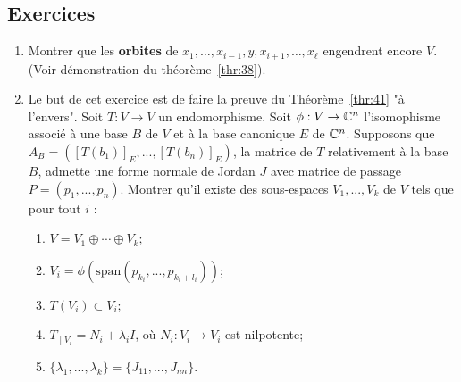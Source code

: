 \subsection*{Exercices} 

\begin{enumerate}
\item Montrer que les \textbf{orbites} de 
$ x_1,\dots, x_{i-1},y,x_{i+1},\dots,x_\ell $ engendrent encore $V$. (Voir démonstration du théorème~\ref{thr:38}). 

\item Le but de cet exercice est de faire la preuve du Théorème~\ref{thr:41} "à l'envers". \newline
Soit $T \colon V \rightarrow V$ un endomorphisme. Soit $\phi : V \rightarrow \Bbb C^n$ l'isomophisme associé à une base $B$ de $V$ et à la base canonique $E$ de $\Bbb C^n$. Supposons que $A_{B} = ([T(b_1)]_E, ..., [T(b_n)]_E)$, la matrice de $T$ relativement à la base $B$, admette une forme normale de Jordan $J$ avec matrice de passage $P = (p_1, ..., p_n)$. \newline
Montrer qu'il existe des sous-espaces $V_1, ..., V_k$  de $V$ tels que pour tout $i$ :
\begin{enumerate}
\item $V = V_1 \oplus \cdots \oplus V_k$;
\item $V_i = \phi(\text{span}(p_{k_i}, ..., p_{k_i + l_i}))$;
\item $T(V_i) \subset V_i$;
\item $T_{∣V_i} = N_i + \lambda_i I$, où $N_i \colon V_i \rightarrow V_i$ est nilpotente;
\item $\{\lambda_1, ..., \lambda_k\} = \{J_{11}, ..., J_{nn}\}$.
\end{enumerate} 


\end{enumerate}
